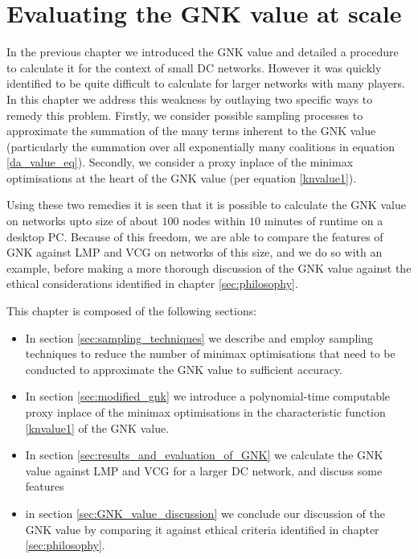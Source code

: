 



\chapter{Evaluating the GNK value at scale}\label{sec:scaling}

In the previous chapter we introduced the GNK value and detailed a procedure to calculate it for the context of small DC networks.
However it was quickly identified to be quite difficult to calculate for larger networks with many players.
In this chapter we address this weakness by outlaying two specific ways to remedy this problem.
Firstly, we consider possible sampling processes to approximate the summation of the many terms inherent to the GNK value (particularly the summation over all exponentially many coalitions in equation \ref{da_value_eq}).
Secondly, we consider a proxy inplace of the minimax optimisations at the heart of the GNK value (per equation \ref{knvalue1}).

Using these two remedies it is seen that it is possible to calculate the GNK value on networks upto size of about $100$ nodes within $10$ minutes of runtime on a desktop PC.
Because of this freedom, we are able to compare the features of GNK against LMP and VCG on networks of this size, and we do so with an example, before making a more thorough discussion of the GNK value against the ethical considerations identified in chapter \ref{sec:philosophy}.

This chapter is composed of the following sections:
\begin{itemize}
    \item In section \ref{sec:sampling_techniques} we describe and employ sampling techniques to reduce the number of minimax optimisations that need to be conducted to approximate the GNK value to sufficient accuracy.
    \item In section \ref{sec:modified_gnk} we introduce a polynomial-time computable proxy inplace of the minimax optimisations in the characteristic function \eqref{knvalue1} of the GNK value.
    \item In section \ref{sec:results_and_evaluation_of_GNK} we calculate the GNK value against LMP and VCG for a larger DC network, and discuss some features
    \item in section \ref{sec:GNK_value_discussion} we conclude our discussion of the GNK value by comparing it against ethical criteria identified in chapter \ref{sec:philosophy}.
\end{itemize}

